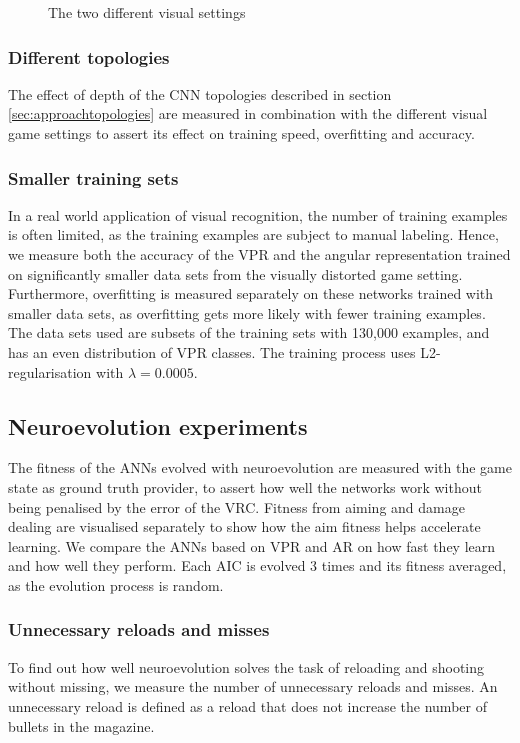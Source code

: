 \begin{figure}[H]
	\begin{scriptsize}
		
	\end{scriptsize}
	\caption{The two different visual settings}
	\label{fig:light}
\end{figure}

\subsubsection{Different topologies}
The effect of depth of the CNN topologies described in section \ref{sec:approachtopologies} are measured in combination with the different visual game settings to assert its effect on training speed, overfitting and accuracy.

\subsubsection{Smaller training sets}
In a real world application of visual recognition, the number of training examples is often limited, as the training examples are subject to manual labeling. Hence, we measure both the accuracy of the VPR and the angular representation trained on significantly smaller data sets from the visually distorted game setting. Furthermore, overfitting is measured separately on these networks trained with smaller data sets, as overfitting gets more likely with fewer training examples. The data sets used are subsets of the training sets with 130,000 examples, and has an even distribution of VPR classes. The training process uses L2-regularisation with $\lambda = 0.0005$.

 
\subsection{Neuroevolution experiments}
The fitness of the ANNs evolved with neuroevolution are measured with the game state as ground truth provider, to assert how well the networks work without being penalised by the error of the VRC. Fitness from aiming and damage dealing are visualised separately to show how the aim fitness helps accelerate learning. We compare the ANNs based on VPR and AR on how fast they learn and how well they perform. Each AIC is evolved 3 times and its fitness averaged, as the evolution process is random.

\subsubsection{Unnecessary reloads and misses}
To find out how well neuroevolution solves the task of reloading and shooting without missing, we measure the number of unnecessary reloads and misses. An unnecessary reload is defined as a reload that does not increase the number of bullets in the magazine.

